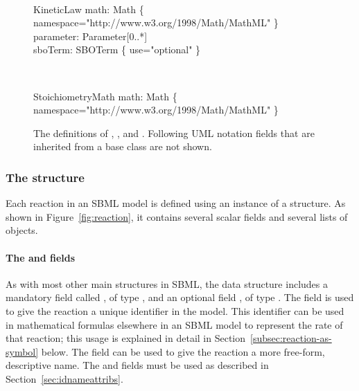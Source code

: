 \begin{figure}[htb]
  \\
  \begin{classbox}{KineticLaw}
    math: Math \{ namespace="http://www.w3.org/1998/Math/MathML" \} \\
    parameter: Parameter[0..*]                                      \\
    sboTerm: SBOTerm \{ use="optional" \}             \\
  \end{classbox}
  \\[2ex]
  \begin{classbox}{StoichiometryMath}  
    math: Math \{ namespace="http://www.w3.org/1998/Math/MathML" \} \\
  \end{classbox}
  \caption{The definitions of \Reaction, \KineticLaw,
    \SpeciesReference and \ModifierSpeciesReference.
    Following UML notation fields
    that are inherited from a base class are not shown.}
  \label{fig:reaction}
\end{figure}


\subsubsection{The  structure}
\label{sec:reaction-type}\label{sec:reaction-sboterm}

Each reaction in an SBML model is defined using an instance of a
\Reaction structure.  As shown in Figure~\vref{fig:reaction}, it
contains several scalar fields and several lists of objects.


\paragraph{The  and  fields}

As with most other main structures in SBML, the \Reaction data
structure includes a mandatory field called , of type
, and an optional field , of type
.  The  field is used to give the
reaction a unique identifier in the model.  This identifier can be
used in mathematical formulas elsewhere in an SBML model to
represent the rate of that reaction; this usage is explained in
detail in Section~\ref{subsec:reaction-as-symbol} below.  The
 field can be used to give the reaction a more
free-form, descriptive name.  The  and 
fields must be used as described in
Section~\ref{sec:idnameattribs}.


